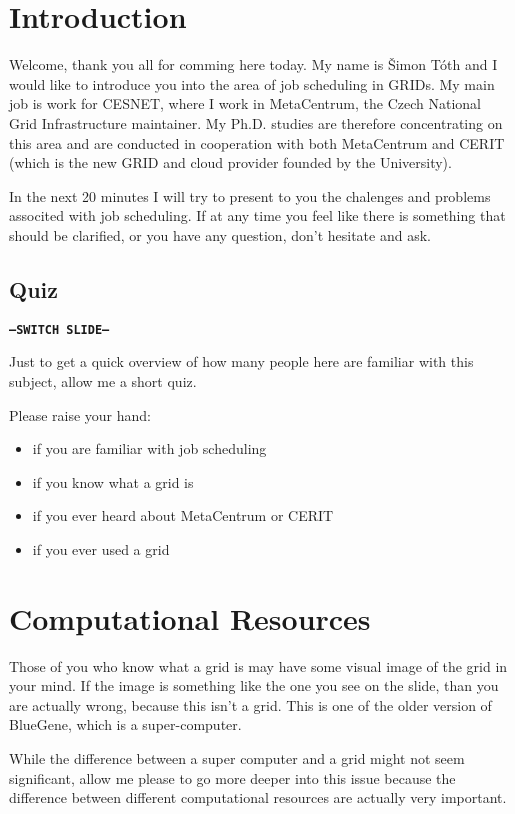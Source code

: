 \documentclass[12pt,a4paper]{article}
\begin{document}
\section{Introduction}

Welcome, thank you all for comming here today. My name is Šimon Tóth and I
would like to introduce you into the area of job scheduling in GRIDs.  My main
job is work for CESNET, where I work in MetaCentrum, the Czech National Grid
Infrastructure maintainer.  My Ph.D. studies are therefore concentrating on
this area and are conducted in cooperation with both MetaCentrum and CERIT
(which is the new GRID and cloud provider founded by the University).

In the next 20 minutes I will try to present to you the chalenges and problems
associted with job scheduling.  If at any time you feel like there is something
that should be clarified, or you have any question, don't hesitate and ask.

\subsection{Quiz}

\texttt{\textbf{---SWITCH SLIDE---}}

Just to get a quick overview of how many people here are familiar with this
subject, allow me a short quiz.

Please raise your hand:

\begin{itemize}
	\item if you are familiar with job scheduling
	\item if you know what a grid is
	\item if you ever heard about MetaCentrum or CERIT
	\item if you ever used a grid
\end{itemize}

\section{Computational Resources}

Those of you who know what a grid is may have some visual image of the grid in
your mind.  If the image is something like the one you see on the slide, than
you are actually wrong, because this isn't a grid.  This is one of the older
version of BlueGene, which is a super-computer.

While the difference between a super computer and a grid might not seem
significant, allow me please to go more deeper into this issue because the
difference between different computational resources are actually very
important.
\end{document}
